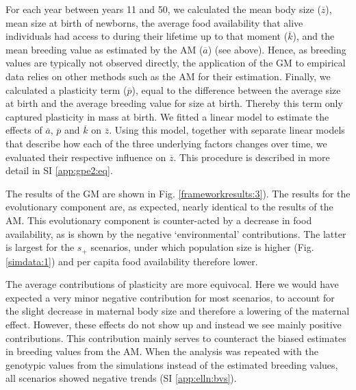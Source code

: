 For each year between years 11 and 50, we calculated the mean body size ($\overline z$), mean size at birth of newborns, the average food availability that alive individuals had access to during their lifetime up to that moment ($\overline k$), and the mean breeding value as estimated by the AM ($\overline a$) (see above). Hence, as breeding values are typically not observed directly, the application of the GM to empirical data relies on other methods such as the AM for their estimation. Finally, we calculated a plasticity term ($\overline p$), equal to the difference between the average size at birth and the average breeding value for size at birth. Thereby this term only captured plasticity in mass at birth. 
We fitted a linear model to estimate the effects of $\overline a$, $\overline p$ and $\overline k$ on $\overline z$. Using this model, together with separate linear models that describe how each of the three underlying factors changes over time, we evaluated their respective influence on $\overline z$. This procedure is described in more detail in SI \ref{app:gpe2:eq}.

The results of the GM are shown in Fig. \ref{frameworkresults:3}). The results for the evolutionary component are, as expected, nearly identical to the results of the AM. This evolutionary component is counter-acted by a decrease in food availability, as is shown by the negative `environmental' contributions. The latter is largest for the $s_+$ scenarios, under which population size is higher (Fig. \ref{simdata:1}) and per capita food availability therefore lower. 

The average contributions of plasticity are more equivocal. Here we would have expected a very minor negative contribution for most scenarios, to account for the slight decrease in maternal body size and therefore a lowering of the maternal effect. However, these effects do not show up and instead we see mainly positive contributions. This contribution mainly serves to counteract the biased estimates in breeding values from the AM. When the analysis was repeated with the genotypic values from the simulations instead of the estimated breeding values, all scenarios showed negative trends (SI \ref{app:elln:bvs}).

